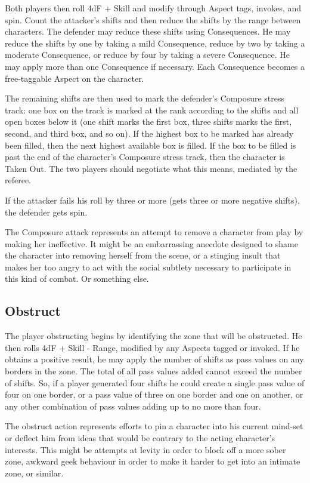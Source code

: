 Both players then roll 4dF + Skill and modify through Aspect tags, invokes, and spin. Count the attacker's shifts and then reduce the shifts by the range between characters. The defender may reduce these shifts using Consequences. He may reduce the shifts by one by taking a mild Consequence, reduce by two by taking a moderate Consequence, or reduce by four by taking a severe Consequence. He may apply more than one Consequence if necessary. Each Consequence becomes a free-taggable Aspect on the character.

The remaining shifts are then used to mark the defender's Composure stress track: one box on the track is marked at the rank according to the shifts and all open boxes below it (one shift marks the first box, three shifts marks the first, second, and third box, and so on). If the highest box to be marked has already been filled, then the next highest available box is filled. If the box to be filled is past the end of the character's Composure stress track, then the character is Taken Out. The two players should negotiate what this means, mediated by the referee.

If the attacker fails his roll by three or more (gets three or more negative shifts), the defender gets spin.

The Composure attack represents an attempt to remove a character from play by making her ineffective. It might be an embarrassing anecdote designed to shame the character into removing herself from the scene, or a stinging insult that makes her too angry to act with the social subtlety necessary to participate in this kind of combat. Or something else.

\subsection{Obstruct}\label{sec:Obstruct}

The player obstructing begins by identifying the zone that will be obstructed. He then rolls 4dF + Skill - Range, modified by any Aspects tagged or invoked. If he obtains a positive result, he may apply the number of shifts as pass values on any borders in the zone. The total of all pass values added cannot exceed the number of shifts. So, if a player generated four shifts he could create a single pass value of four on one border, or a pass value of three on one border and one on another, or any other combination of pass values adding up to no more than four.

The obstruct action represents efforts to pin a character into his current mind-set or deflect him from ideas that would be contrary to the acting character's interests. This might be attempts at levity in order to block off a more sober zone, awkward geek behaviour in order to make it harder to get into an intimate zone, or similar.

